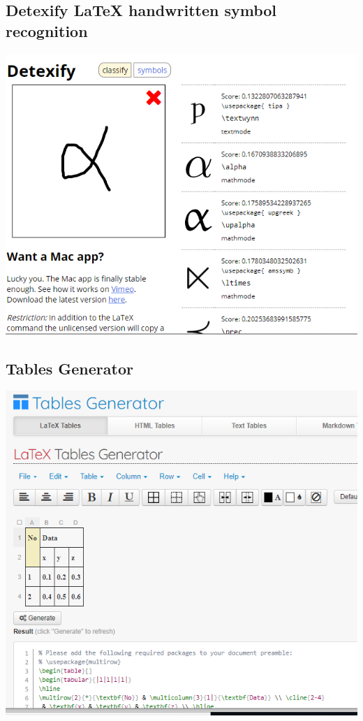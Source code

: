 \subsection{Detexify LaTeX handwritten symbol recognition}
\begin{center}
	\includegraphics[width=\linewidth]{bab2/Detexify}
	\label{fig:detexify}
\end{center}
\newpage
\subsection{Tables Generator }
\begin{center}
	
	\includegraphics[width=0.7\linewidth]{bab2/TabelGenerator}
	\label{fig:tabelgenerator}
\end{center}

